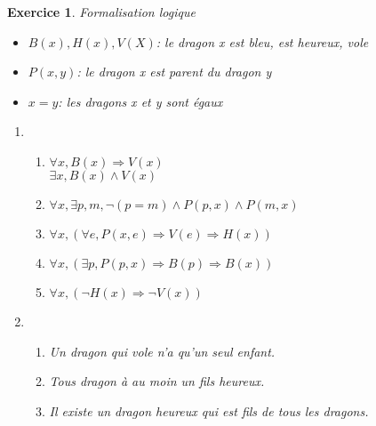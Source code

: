 \documentclass{article}
\theoremstyle{plain}
\newtheorem{exo}{Exercice}%
\begin{document}
\begin{exo} Formalisation logique
\begin{itemize}
    \item $B(x), H(x), V(X)$: le dragon x est bleu, est heureux, vole
    \item $P(x, y)$: le dragon x est parent du dragon y
    \item $x = y$: les dragons x et y sont égaux 
\end{itemize}
\begin{enumerate}
    \item \begin{enumerate}
        \item $\forall x, B(x) \Rightarrow V(x)$ \\
                $\exists x, B(x) \wedge V(x)$
        \item $\forall x, \exists p, m, \neg (p = m) \wedge P(p, x) \wedge P(m, x)$
        \item $\forall x, (\forall e, P(x, e) \Rightarrow V(e) \Rightarrow H(x))$
        \item $\forall x, (\exists p, P(p, x) \Rightarrow B(p) \Rightarrow  B(x))$
        \item $\forall x, (\neg H(x) \Rightarrow \neg V(x))$
    \end{enumerate}
    \item \begin{enumerate}
        \item Un dragon qui vole n'a qu'un seul enfant.
        \item Tous dragon à au moin un fils heureux.
        \item Il existe un dragon heureux qui est fils de tous les dragons.
    \end{enumerate}
\end{enumerate}
\end{exo}
\end{document}
